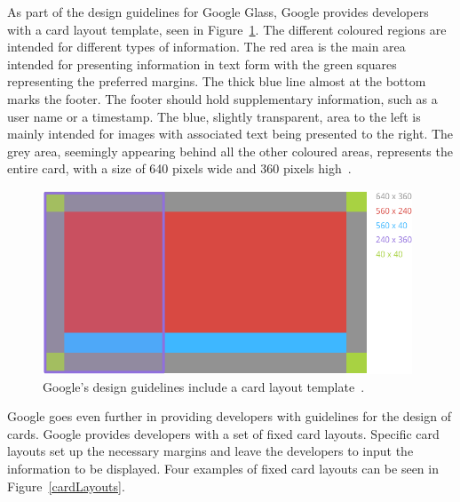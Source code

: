 As part of the design guidelines for Google Glass, Google provides developers with a card layout template, seen in Figure~\ref{GlassDesignStyle}. The different coloured regions are intended for different types of information. The red area is the main area intended for presenting information in text form with the green squares representing the preferred margins. The thick blue line almost at the bottom marks the footer. The footer should hold supplementary information, such as a user name or a timestamp. The blue,  slightly transparent, area to the left is mainly intended for images with associated text being presented to the right. The grey area, seemingly appearing behind all the other coloured areas, represents the entire card, with a size of 640 pixels wide and 360 pixels high~\cite{glassDesignStyle}.

	\begin{figure}[ht!]
		\centering
		\includegraphics[width=110mm]{images/standard-template}
		\caption{Google's design guidelines include a card layout template~\cite{glassDesignStyle}.}
		\label{GlassDesignStyle}
	\end{figure}

Google goes even further in providing developers with guidelines for the design of cards. Google provides developers with a set of fixed card layouts. Specific card layouts set up the necessary margins and leave the developers to input the information to be displayed. Four examples of fixed card layouts can be seen in Figure~\ref{cardLayouts}.

